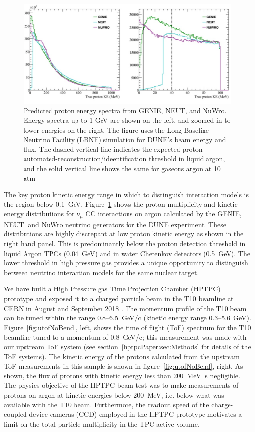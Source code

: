 \begin{figure}%
    \centering
    \includegraphics[width=12cm]{files/Figures/protons_from_argon.jpeg}%
    \caption{Predicted proton energy spectra from GENIE, NEUT, and NuWro\cite{Raaf:2018aaa}. Energy spectra up to 1 GeV are shown on the left, and zoomed in to lower energies on the right. The figure uses the Long Baseline Neutrino Facility (LBNF) simulation for DUNE's beam energy and flux. The dashed vertical line indicates the expected proton automated-reconstruction/ideentification threshold in liquid argon, and the solid vertical line shows the same for gaseous argon at 10 atm~\cite{dune2018high}}
    \label{fig:protonsfromargon}%
\end{figure}

The key proton kinetic energy range in which to distinguish interaction models is the region below 0.1~GeV.
Figure~\ref{fig:protonsfromargon} shows the proton multiplicity and kinetic energy distributions for $\nu_{\mu}$ CC interactions on argon calculated by the GENIE, NEUT, and NuWro neutrino generators for the DUNE experiment.
These distributions are highly discrepant at low proton kinetic energy as shown in the right hand panel.
This is predominantly below the proton detection threshold in liquid Argon TPCs (0.04~GeV) and in water Cherenkov detectors (0.5~GeV).
The lower threshold in high pressure gas provides a unique opportunity to distinguish between neutrino interaction models for the same nuclear target.

We have built a High Pressure gas Time Projection Chamber (HPTPC) prototype and exposed it to a charged particle beam in the T10 beamline at CERN in August and September 2018 \cite{SPSC-P-355}.
The momentum profile of the T10 beam can be tuned within the range 0.8--6.5~GeV/c (kinetic energy range 0.3--5.6~GeV). 
Figure~\ref{fig:utofNoBend}, left, shows the time of flight (ToF) spectrum for the T10 beamline tuned to a momentum of 0.8~GeV/c; this measurement was made with our upstream ToF system (see section~\ref{hptpcPaper:sec:Methods} for details of the ToF systems).
The kinetic energy of the protons calculated from the upstream ToF measurements in this sample is shown in figure~\ref{fig:utofNoBend}, right.
As shown, the flux of protons with kinetic energy less than 200~MeV is negligible.
The physics objective of the HPTPC beam test was to make measurements of protons on argon at kinetic energies below 200~MeV, i.e. below what was available with the T10 beam. 
Furthermore, the readout speed of the charge-coupled device cameras (CCD) employed in the HPTPC prototype motivates a limit on the total particle multiplicity in the TPC active volume.

